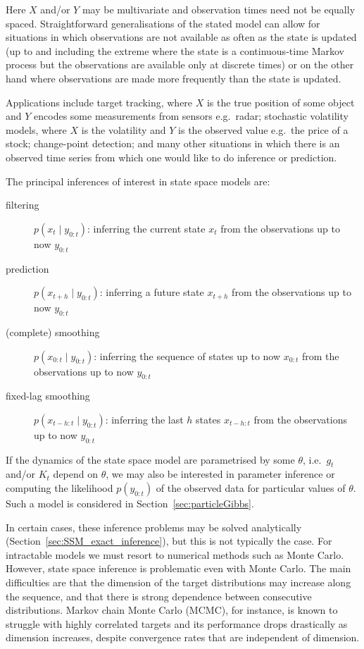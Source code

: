 Here $X$ and/or $Y$ may be multivariate and observation times need not be equally spaced. Straightforward generalisations of the stated model can allow for situations in which observations are not available as often as the state is updated (up to and including the extreme where the state is a continuous-time Markov process but the observations are available only at discrete times) or on the other hand where observations are made more frequently than the state is updated.

Applications include target tracking, where $X$ is the true position of some object and $Y$ encodes some measurements from sensors e.g.\ radar; stochastic volatility models, where $X$ is the volatility and $Y$ is the observed value e.g.\ the price of a stock; change-point detection; and many other situations in which there is an observed time series from which one would like to do inference or prediction.

The principal inferences of interest in state space models are:
\begin{description}
\item [filtering] $p(x_t\mid y_{0:t})$: inferring the current state $x_t$ from the observations up to now $y_{0:t}$
\item [prediction] $p(x_{t+h}\mid y_{0:t})$: inferring a future state $x_{t+h}$ from the observations up to now $y_{0:t}$
\item [(complete) smoothing] $p(x_{0:t}\mid y_{0:t})$: inferring the sequence of states up to now $x_{0:t}$ from the observations up to now $y_{0:t}$
\item [fixed-lag smoothing] $p(x_{t-h:t}\mid y_{0:t})$: inferring the last $h$ states $x_{t-h:t}$ from the observations up to now $y_{0:t}$
\end{description}
If the dynamics of the state space model are parametrised by some $\theta$, i.e.\ $g_t$ and/or $K_t$ depend on $\theta$, we may also be interested in parameter inference or computing the likelihood $p(y_{0:t})$ of the observed data for particular values of $\theta$. Such a model is considered in Section~\ref{sec:particleGibbs}.

In certain cases, these inference problems may be solved analytically (Section~\ref{sec:SSM_exact_inference}), but this is not typically the case. For intractable models we must resort to numerical methods such as Monte Carlo. However, state space inference is problematic even with Monte Carlo. 
The main difficulties are that the dimension of the target distributions may increase along the sequence, and that there is strong dependence between consecutive distributions. Markov chain Monte Carlo (MCMC), for instance, is known to struggle with highly correlated targets\seb{[citation]} and its performance drops drastically as dimension increases, despite convergence rates that are independent of dimension\seb{[citation]}.

